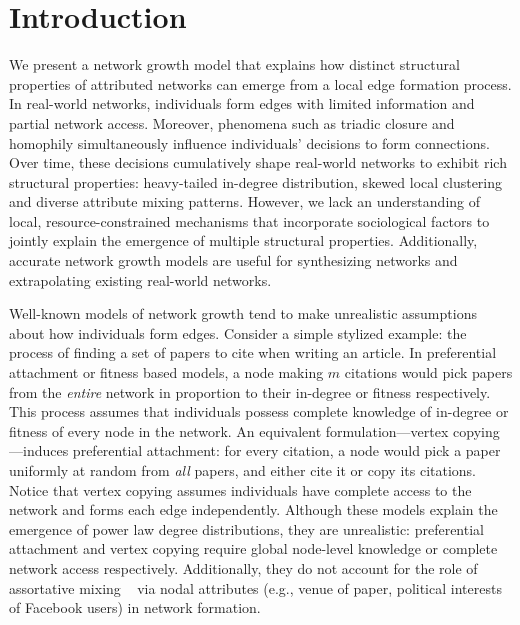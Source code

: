 \section{Introduction}
\label{sec:Introduction}



We present a network growth model that explains how distinct
structural properties of attributed networks can emerge from a local edge
formation process. In real-world networks, individuals form edges
with limited information and partial network access.
Moreover, phenomena such as triadic closure and homophily
simultaneously influence individuals' decisions to form connections.
Over time, these decisions cumulatively shape real-world networks to exhibit
rich structural properties: heavy-tailed in-degree distribution, skewed
local clustering and diverse attribute mixing patterns. However, we lack an
understanding of local, resource-constrained mechanisms that incorporate
sociological factors to jointly explain the emergence of multiple structural properties.
Additionally, accurate network growth models are useful for synthesizing networks and extrapolating existing real-world networks.



Well-known models of network growth tend to make unrealistic assumptions about how
individuals form edges. Consider a simple stylized example: the process of
finding a set of papers to cite when writing an article. In preferential
attachment \cite{barabasi1999emergence} or fitness
\cite{bianconi2001bose,caldarelli2002scale,wang2013quantifying} based models, a
node making $m$ citations would pick papers from the \textit{entire} network in
proportion to their in-degree or fitness respectively. This process assumes that
individuals possess {complete} knowledge of in-degree or fitness of every node
in the network. An equivalent formulation---vertex copying
\cite{kumar2000stochastic}---induces preferential attachment: for every
citation, a node would pick a paper uniformly at random from \textit{all}
papers, and either cite it or copy its citations. Notice that vertex copying assumes individuals have complete access to the network and forms each
edge independently. Although these models explain the emergence of power law
degree distributions, they are unrealistic: preferential attachment and vertex
copying require global node-level knowledge or complete network access respectively.
Additionally, they do not account for the role of assortative mixing ~\cite{newman2002assortative} via nodal attributes (e.g., venue of paper, political interests of Facebook users) in network formation.

